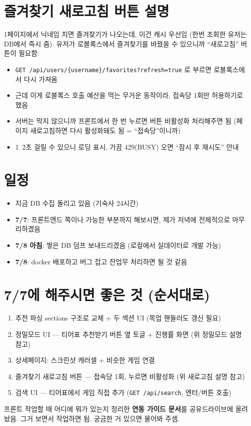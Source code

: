 \documentclass[11pt]{article}
\begin{document}
\section*{즐겨찾기 새로고침 버튼 설명}

1페이지에서 닉네임 치면 즐겨찾기가 나오는데, 이건 캐시 우선임 (한번 조회한 유저는
DB에서 즉시 줌). 유저가 로블록스에서 즐겨찾기를 바꿨을 수 있으니까 ``새로고침''
버튼이 필요함:

\begin{itemize}
  \item \texttt{GET /api/users/\{username\}/favorites?refresh=true} 로 부르면
        로블록스에서 다시 가져옴
  \item 근데 이게 로블록스 호출 예산을 먹는 무거운 동작이라, 접속당 1회만 허용하기로 했음
  \item 서버는 막지 않으니까 프론트에서 한 번 누르면 버튼 비활성화 처리해주면 됨
        (페이지 새로고침하면 다시 활성화돼도 됨 = ``접속당''이니까)
  \item 1~2초 걸릴 수 있으니 로딩 표시, 가끔 429(BUSY) 오면 ``잠시 후 재시도'' 안내
\end{itemize}

\section*{일정}

\begin{itemize}
  \item 지금 DB 수집 돌리고 있음 (기숙사 24시간)
  \item \textbf{7/7}: 프론트엔드 쪽이나 가능한 부분까지 해보시면, 제가 저녁에
        전체적으로 마무리하겠음
  \item \textbf{7/8 아침}: 쌓은 DB 덤프 보내드리겠음 (로컬에서 실데이터로 개발 가능)
  \item \textbf{7/8}: docker 배포하고 버그 잡고 잔업무 처리하면 될 것 같음
\end{itemize}

\section*{7/7에 해주시면 좋은 것 (순서대로)}

\begin{enumerate}
  \item 추천 파싱 sections 구조로 교체 + 두 섹션 UI (목업 핸들러도 갱신 필요)
  \item 정밀모드 UI --- 티어표 추천받기 버튼 옆 토글 + 진행률 화면 (위 정밀모드 설명 참고)
  \item 상세페이지: 스크린샷 캐러셀 + 비슷한 게임 연결
  \item 즐겨찾기 새로고침 버튼 --- 접속당 1회, 누르면 비활성화 (위 새로고침 설명 참고)
  \item 검색 UI --- 티어표에서 게임 직접 추가 (\texttt{GET /api/search}, 엔터/버튼 호출)
\end{enumerate}

\vspace{1em}
프론트 작업할 때 어디에 뭐가 있는지 정리한 \textbf{연동 가이드 문서}를 공유드라이브에
올려놨음. 그거 보면서 작업하면 됨. 궁금한 거 있으면 물어봐 주셈.
\end{document}
